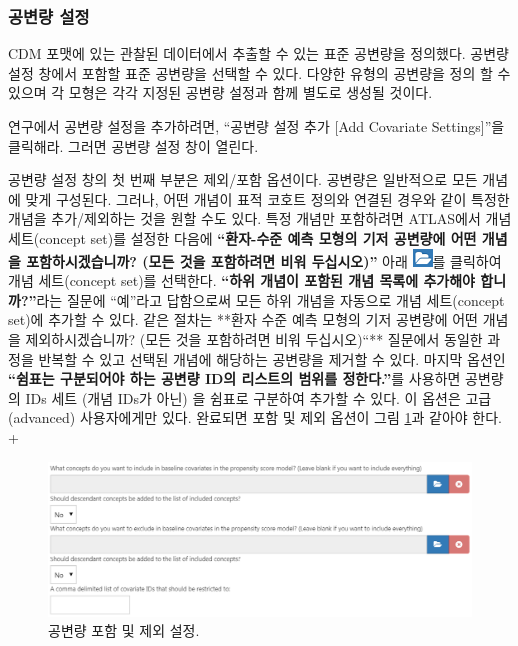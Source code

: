 \documentclass[11pt]{book}
\theoremstyle{definition}
\theoremstyle{definition}
\theoremstyle{definition}
\theoremstyle{remark}
\begin{document}
\subsubsection*{공변량 설정}\label{--1}

CDM 포맷에 있는 관찰된 데이터에서 추출할 수 있는 표준 공변량을 정의했다.
공변량 설정 창에서 포함할 표준 공변량을 선택할 수 있다. 다양한 유형의
공변량을 정의 할 수 있으며 각 모형은 각각 지정된 공변량 설정과 함께
별도로 생성될 것이다.

연구에서 공변량 설정을 추가하려면, ``공변량 설정 추가 {[}Add Covariate
Settings{]}''을 클릭해라. 그러면 공변량 설정 창이 열린다.

공변량 설정 창의 첫 번째 부분은 제외/포함 옵션이다. 공변량은 일반적으로
모든 개념에 맞게 구성된다. 그러나, 어떤 개념이 표적 코호트 정의와 연결된
경우와 같이 특정한 개념을 추가/제외하는 것을 원할 수도 있다. 특정 개념만
포함하려면 ATLAS에서 개념 세트(concept set)를 설정한 다음에
\textbf{``환자-수준 예측 모형의 기저 공변량에 어떤 개념을
포함하시겠습니까? (모든 것을 포함하려면 비워 두십시오)''} 아래
\includegraphics{images/PopulationLevelEstimation/open.png}를 클릭하여
개념 세트(concept set)를 선택한다. \textbf{``하위 개념이 포함된 개념
목록에 추가해야 합니까?''}라는 질문에 ``예''라고 답함으로써 모든 하위
개념을 자동으로 개념 세트(concept set)에 추가할 수 있다. 같은 절차는
**환자 수준 예측 모형의 기저 공변량에 어떤 개념을 제외하시겠습니까?
(모든 것을 포함하려면 비워 두십시오)``** 질문에서 동일한 과정을 반복할
수 있고 선택된 개념에 해당하는 공변량을 제거할 수 있다. 마지막 옵션인
\textbf{``쉼표는 구분되어야 하는 공변량 ID의 리스트의 범위를
정한다.''}를 사용하면 공변량의 IDs 세트 (개념 IDs가 아닌) 을 쉼표로
구분하여 추가할 수 있다. 이 옵션은 고급(advanced) 사용자에게만 있다.
완료되면 포함 및 제외 옵션이 그림 \ref{fig:covariateSettings1}과 같아야
한다. +

\begin{figure}

{\centering \includegraphics[width=1\linewidth]{images/PatientLevelPrediction/covariateSettings1} 

}

\caption{공변량 포함 및 제외 설정.}\label{fig:covariateSettings1}
\end{figure}
\end{document}
